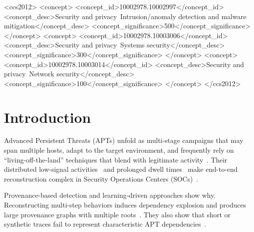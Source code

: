 \documentclass[sigconf]{acmart}
\begin{document}
\begin{CCSXML}
<ccs2012>
   <concept>
       <concept_id>10002978.10002997</concept_id>
       <concept_desc>Security and privacy~Intrusion/anomaly detection and malware mitigation</concept_desc>
       <concept_significance>500</concept_significance>
       </concept>
   <concept>
       <concept_id>10002978.10003006</concept_id>
       <concept_desc>Security and privacy~Systems security</concept_desc>
       <concept_significance>300</concept_significance>
       </concept>
   <concept>
       <concept_id>10002978.10003014</concept_id>
       <concept_desc>Security and privacy~Network security</concept_desc>
       <concept_significance>100</concept_significance>
       </concept>
 </ccs2012>
\end{CCSXML}


\maketitle
\section{Introduction}\label{sec:introduction}

Advanced Persistent Threats (APTs) unfold as multi-stage campaigns that may span multiple hosts, adapt to the target environment, and frequently rely on “living-off-the-land” techniques that blend with legitimate activity~\cite{barr-smith2021survivalism}. Their distributed low-signal activities~\cite{lourenco2024devil} and prolonged dwell times~\cite{milajerdi2019holmes} make end-to-end reconstruction complex in Security Operations Centers (SOCs)~\cite{clearSkyFoxKitten,fireeyeAPT41,mandiant2025mtrends}.

Provenance-based detection and learning-driven approaches show why. Reconstructing multi-step behaviors induces dependency explosion and produces large provenance graphs with multiple roots~\cite{hossain202comb,10646673,10646725,zian2024magic}. They also show that short or synthetic traces fail to represent characteristic APT dependencies~\cite{milajerdi2019holmes,han2020unicorn,lourenco2024devil}.
\end{document}

